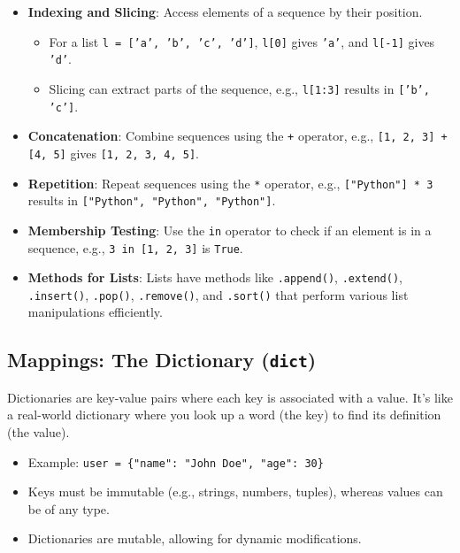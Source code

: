 \documentclass{article}
\begin{document}
\begin{itemize}
    \item \textbf{Indexing and Slicing}: Access elements of a sequence by their position.
    \begin{itemize}
        \item For a list \texttt{l = ['a', 'b', 'c', 'd']}, \texttt{l[0]} gives \texttt{'a'}, and \texttt{l[-1]} gives \texttt{'d'}.
        \item Slicing can extract parts of the sequence, e.g., \texttt{l[1:3]} results in \texttt{['b', 'c']}.
    \end{itemize}
    
    \item \textbf{Concatenation}: Combine sequences using the \texttt{+} operator, e.g., \texttt{[1, 2, 3] + [4, 5]} gives \texttt{[1, 2, 3, 4, 5]}.
    
    \item \textbf{Repetition}: Repeat sequences using the \texttt{*} operator, e.g., \texttt{["Python"] * 3} results in \texttt{["Python", "Python", "Python"]}.
    
    \item \textbf{Membership Testing}: Use the \texttt{in} operator to check if an element is in a sequence, e.g., \texttt{3 in [1, 2, 3]} is \texttt{True}.
    
    \item \textbf{Methods for Lists}: Lists have methods like \texttt{.append()}, \texttt{.extend()}, \texttt{.insert()}, \texttt{.pop()}, \texttt{.remove()}, and \texttt{.sort()} that perform various list manipulations efficiently.
\end{itemize}

\subsection{Mappings: The Dictionary (\texttt{dict})}

Dictionaries are key-value pairs where each key is associated with a value. It's like a real-world dictionary where you look up a word (the key) to find its definition (the value).

\begin{itemize}
    \item Example: \texttt{user = \{"name": "John Doe", "age": 30\}}
    \item Keys must be immutable (e.g., strings, numbers, tuples), whereas values can be of any type.
    \item Dictionaries are mutable, allowing for dynamic modifications.
\end{itemize}
\end{document}
